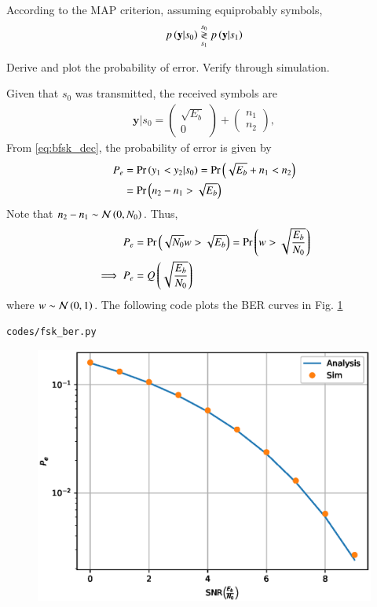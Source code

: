 \documentclass[journal,12pt,twocolumn]{IEEEtran}
\begin{document}
\solution According to the MAP criterion, assuming equiprobably symbols,
\begin{align}
p\left(\mathbf{y}|s_0\right) \overset{s_0}{\underset{s_1}{\gtrless}} p\left(\mathbf{y}|s_1\right)
\end{align}
\begin{problem}
Derive and plot the probability of error.  Verify through simulation.
\end{problem}
\solution Given that $s_0$ was transmitted, the received symbols are
\begin{align}
\mathbf{y}|s_0 = 
\begin{pmatrix*}
\sqrt{E_b} \\
0
\end{pmatrix*}
+
\begin{pmatrix*}
 n_{1}\\
n_{2}
\end{pmatrix*},
\end{align}
From \eqref{eq:bfsk_dec}, 
the probability of error is given by
\begin{align}
P_e &= \Pr\left(y_1 < y_2|s_0\right) = \Pr\left(\sqrt{E_b} + n_1 < n_2\right)
\\
&= \Pr\left( n_2-n_1 > \sqrt{E_b} \right) 
\label{eq:bfsk_proof_n0}
\end{align}
Note that $n_2-n_1 \sim \mathcal{N}\left(0,N_0\right)$. Thus, 
\begin{align}
P_e &= \Pr\left( \sqrt{N_0}w > \sqrt{E_b} \right)  =  \Pr\left( w > \sqrt{\frac{E_b}{N_0}} \right)
\\
\implies 
P_e & = Q\left(\sqrt{\frac{E_b}{N_0}}\right)
\end{align}
where 
$w \sim \mathcal{N}\left(0,1\right)$.  
%
The following code plots the BER curves in Fig. \ref{fig:bfsk_ber}
\begin{lstlisting}
codes/fsk_ber.py
\end{lstlisting}
%
\begin{figure}[!h]
\centering
\includegraphics[width=\columnwidth]{./figs/bfsk_ber.eps}
\caption{}
\label{fig:bfsk_ber}
\end{figure}
\end{document}
